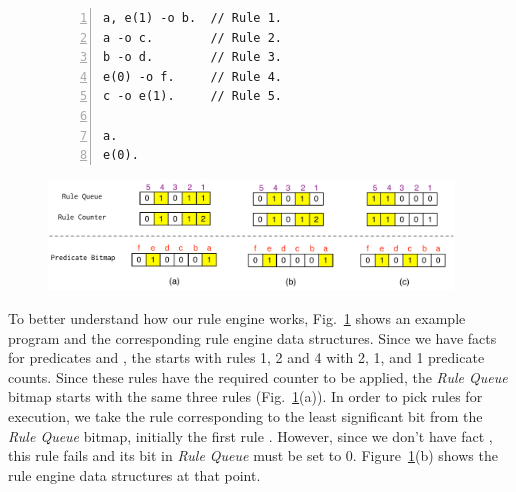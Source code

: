 \begin{figure}[t]
   \begin{center}
\begin{BVerbatim}[numbers=left,fontsize=\codesize]
a, e(1) -o b.  // Rule 1.
a -o c.        // Rule 2.
b -o d.        // Rule 3.
e(0) -o f.     // Rule 4.
c -o e(1).     // Rule 5.

a.
e(0).
\end{BVerbatim}
\end{center}
\vspace{5mm}
   \includegraphics[width=0.96\textwidth]{figures/implementation/rule_queue.pdf}


   \label{fig:implementation:rule_engine}
\end{figure}

To better understand how our rule engine works,
Fig.~\ref{fig:implementation:rule_engine} shows an example program and the
corresponding rule engine data structures. Since we have facts for predicates
 and , the  starts with rules 1, 2 and 4 with
2, 1, and 1 predicate counts. Since these rules have the required counter to be
applied, the \emph{Rule Queue} bitmap starts with the same three rules
(Fig.~\ref{fig:implementation:rule_engine}(a)). In order to pick rules for
execution, we take the rule corresponding to the least significant bit from the
\emph{Rule Queue} bitmap, initially the first rule .
However, since we don't have fact , this rule fails and its bit in
\emph{Rule Queue} must be set to 0.
Figure~\ref{fig:implementation:rule_engine}(b) shows the rule engine data
structures at that point.

